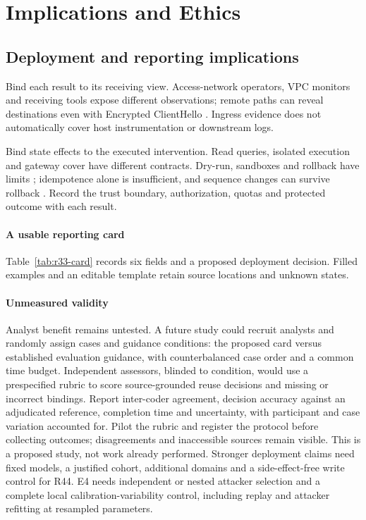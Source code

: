 \section{Implications and Ethics}\label{sec:agenda}
\subsection{Deployment and reporting implications}\label{sec:deployment}
Bind each result to its receiving view. Access-network operators, VPC monitors and receiving tools expose different observations; remote paths can reveal destinations even with Encrypted ClientHello \cite{rfc9849}. Ingress evidence does not automatically cover host instrumentation or downstream logs.

Bind state effects to the executed intervention. Read queries, isolated execution and gateway cover have different contracts. Dry-run, sandboxes and rollback have limits \cite{kubernetesdryrun,stripesandboxes,postgresrollback}; idempotence alone is insufficient, and sequence changes can survive rollback \cite{postgressequences}. Record the trust boundary, authorization, quotas and protected outcome with each result.

\paragraph{A usable reporting card}
Table~\ref{tab:r33-card} records six fields and a proposed deployment decision. Filled examples and an editable template retain source locations and unknown states.


\paragraph{Unmeasured validity}
Analyst benefit remains untested. A future study could recruit analysts and randomly assign cases and guidance conditions: the proposed card versus established evaluation guidance, with counterbalanced case order and a common time budget. Independent assessors, blinded to condition, would use a prespecified rubric to score source-grounded reuse decisions and missing or incorrect bindings. Report inter-coder agreement, decision accuracy against an adjudicated reference, completion time and uncertainty, with participant and case variation accounted for. Pilot the rubric and register the protocol before collecting outcomes; disagreements and inaccessible sources remain visible. This is a proposed study, not work already performed. Stronger deployment claims need fixed models, a justified cohort, additional domains and a side-effect-free write control for R44. E4 needs independent or nested attacker selection and a complete local calibration-variability control, including replay and attacker refitting at resampled parameters.

